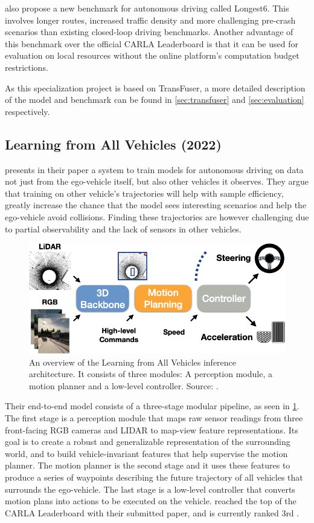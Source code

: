 \textcite{transfuser-pami} also propose a new benchmark for autonomous driving called Longest6. This involves longer routes, increased traffic density and more challenging pre-crash scenarios than existing closed-loop driving benchmarks. Another advantage of this benchmark over the official CARLA Leaderboard is that it can be used for evaluation on local resources without the online platform's computation budget restrictions.

As this specialization project is based on TransFuser, a more detailed description of the model and benchmark can be found in \cref{sec:transfuser} and \cref{sec:evaluation} respectively.


\subsection{Learning from All Vehicles (2022)}
\textcite{chen2022lav} presents in their paper a system to train models for autonomous driving on data not just from the ego-vehicle itself, but also other vehicles it observes.
They argue that training on other vehicle's trajectories will help with sample efficiency, greatly increase the chance that the model sees interesting scenarios and help the ego-vehicle avoid collisions. Finding these trajectories are however challenging due to partial observability and the lack of sensors in other vehicles.

\begin{figure}[htbp]
    \centering
    \includegraphics[width=.7\textwidth]{figures/2/lav.png}
    \caption{An overview of the Learning from All Vehicles inference architecture. It consists of three modules: A perception module, a motion planner and a low-level controller. Source: \cite{chen2022lav}.}
    \label{fig:lav}
\end{figure}

Their end-to-end model consists of a three-stage modular pipeline, as seen in \cref{fig:lav}. The first stage is a perception module that maps raw sensor readings from three front-facing RGB cameras and LIDAR to map-view feature representations. Its goal is to create a robust and generalizable representation of the surrounding world, and to build vehicle-invariant features that help supervise the motion planner. The motion planner is the second stage and it uses these features to produce a series of waypoints describing the future trajectory of all vehicles that surrounds the ego-vehicle. The last stage is a low-level controller that converts motion plans into actions to be executed on the vehicle. \textcite{chen2022lav} reached the top of the CARLA Leaderboard with their submitted paper, and is currently ranked 3rd \cite{chen2022lav, pwc-carla}.


